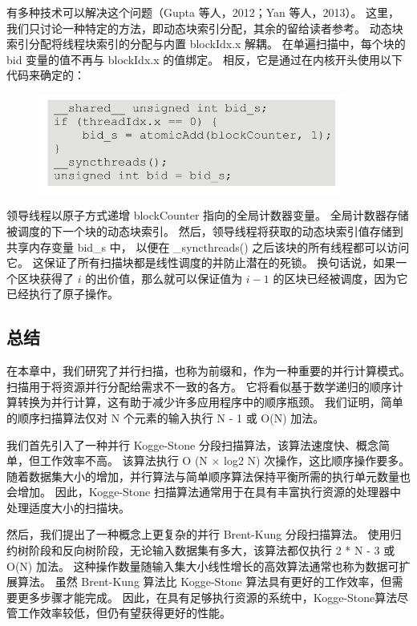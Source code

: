 有多种技术可以解决这个问题（Gupta 等人，2012；Yan 等人，2013）。 
这里，我们只讨论一种特定的方法，即动态块索引分配，其余的留给读者参考。 
动态块索引分配将线程块索引的分配与内置 blockIdx.x 解耦。 
在单遍扫描中，每个块的 bid 变量的值不再与 blockIdx.x 的值绑定。 相反，它是通过在内核开头使用以下代码来确定的：

\begin{figure}[H]
	\centering
	\includegraphics[width=0.9\textwidth]{figs/F11-a8.png}
\end{figure}

领导线程以原子方式递增 blockCounter 指向的全局计数器变量。 全局计数器存储被调度的下一个块的动态块索引。 
然后，领导线程将获取的动态块索引值存储到共享内存变量 bid\_s 中，
以便在 \_syncthreads() 之后该块的所有线程都可以访问它。 这保证了所有扫描块都是线性调度的并防止潜在的死锁。 
换句话说，如果一个区块获得了 $i$ 的出价值，那么就可以保证值为 $i-1$ 的区块已经被调度，因为它已经执行了原子操作。

\subsection{总结}
在本章中，我们研究了并行扫描，也称为前缀和，作为一种重要的并行计算模式。 扫描用于将资源并行分配给需求不一致的各方。 
它将看似基于数学递归的顺序计算转换为并行计算，这有助于减少许多应用程序中的顺序瓶颈。 
我们证明，简单的顺序扫描算法仅对 N 个元素的输入执行 N - 1 或 O(N) 加法。

我们首先引入了一种并行 Kogge-Stone 分段扫描算法，该算法速度快、概念简单，但工作效率不高。 
该算法执行 O (N × log2 N) 次操作，这比顺序操作要多。 
随着数据集大小的增加，并行算法与简单顺序算法保持平衡所需的执行单元数量也会增加。 
因此，Kogge-Stone 扫描算法通常用于在具有丰富执行资源的处理器中处理适度大小的扫描块。

然后，我们提出了一种概念上更复杂的并行 Brent-Kung 分段扫描算法。 
使用归约树阶段和反向树阶段，无论输入数据集有多大，该算法都仅执行 2 * N - 3 或 O(N) 加法。 
这种操作数量随输入集大小线性增长的高效算法通常也称为数据可扩展算法。 
虽然 Brent-Kung 算法比 Kogge-Stone 算法具有更好的工作效率，但需要更多步骤才能完成。 
因此，在具有足够执行资源的系统中，Kogge-Stone算法尽管工作效率较低，但仍有望获得更好的性能。

